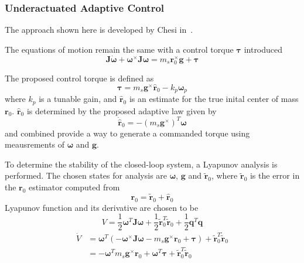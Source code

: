 \subsubsection{Underactuated Adaptive Control}\label{sec:under_adaptive}
The approach shown here is developed by Chesi in~\cite{chesi_automatic_2014}.

The equations of motion remain the same with a control torque $\bm{\tau}$ introduced
\begin{equation} \label{equation:EomWithTau}
    \bm{J}\dot{\bm{\omega}} + \bm{\omega}^\times \bm{J\omega} 
    = m_s\bm{r}_0^{\times}\bm{g} + \bm{\tau}
\end{equation}

The proposed control torque is defined as
\begin{equation}\label{equation:proposed_adaptive}
    \bm{\tau} = m_s\bm{g}^\times\bm{\hat{r}}_0 - k_p\bm{\omega}_p
\end{equation}
where $k_p$ is a tunable gain,  and $\hat{\bm{r}}_0$ is an estimate for the true inital center of mass ${\bm{r}}_0$.  $\hat{\bm{r}}_0$ is determined by the proposed adaptive law given by
\begin{equation} \label{equation:adaptive_law}
    \dot{\hat{\bm{r}}}_0 = -(m_s\bm{g}^{\times})^T\bm{\omega}
\end{equation}
 and  combined provide a way to generate a commanded torque using meausrements of $\bm{\omega}$ and $\bm{g}$. 

To determine the stability of the closed-loop system, a Lyapunov analysis is performed. The chosen states for analysis are $\bm{\omega}$, $\bm{g}$ and $\tilde{\bm{r}}_0$, where $\tilde{\bm{r}}_0$ is the error in the $\bm{r}_0$ estimator computed from
\begin{equation}\label{equation:r_relations}
    \bm{r}_0= \tilde{\bm{r}}_0+\hat{\bm{r}}_0
\end{equation} 
Lyapunov function and its derivative are chosen to be 
\begin{equation}
    {V} = \frac{1}{2}\bm{\omega}^T\bm{J\omega} + \frac{1}{2}\tilde{\bm{r}}_0^T\tilde{\bm{r}}_0 + \frac{1}{2}\bm{q}^T\bm{q}
\end{equation}
\begin{align}
    \dot{V} &= \bm{\omega}^T(-\bm{\omega}^\times \bm{J\omega} 
    -m_s\bm{g}^{\times}\bm{r}_0 + \bm{\tau}) 
    + \tilde{\bm{r}}_0^T\dot{\tilde{\bm{r}}}_0 \\
    &= -\bm{\omega}^Tm_s\bm{g}^{\times}\bm{r}_0+\bm{\omega}^T\bm{\tau}
    + \tilde{\bm{r}}_0^T\dot{\tilde{\bm{r}}}_0
\end{align}

